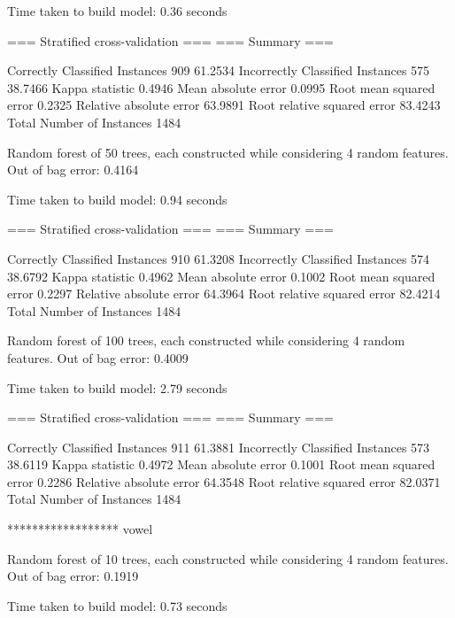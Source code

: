 Time taken to build model: 0.36 seconds

=== Stratified cross-validation ===
=== Summary ===

Correctly Classified Instances         909               61.2534 %
Incorrectly Classified Instances       575               38.7466 %
Kappa statistic                          0.4946
Mean absolute error                      0.0995
Root mean squared error                  0.2325
Relative absolute error                 63.9891 %
Root relative squared error             83.4243 %
Total Number of Instances             1484



Random forest of 50 trees, each constructed while considering 4 random features.
Out of bag error: 0.4164



Time taken to build model: 0.94 seconds

=== Stratified cross-validation ===
=== Summary ===

Correctly Classified Instances         910               61.3208 %
Incorrectly Classified Instances       574               38.6792 %
Kappa statistic                          0.4962
Mean absolute error                      0.1002
Root mean squared error                  0.2297
Relative absolute error                 64.3964 %
Root relative squared error             82.4214 %
Total Number of Instances             1484


Random forest of 100 trees, each constructed while considering 4 random features.
Out of bag error: 0.4009



Time taken to build model: 2.79 seconds

=== Stratified cross-validation ===
=== Summary ===

Correctly Classified Instances         911               61.3881 %
Incorrectly Classified Instances       573               38.6119 %
Kappa statistic                          0.4972
Mean absolute error                      0.1001
Root mean squared error                  0.2286
Relative absolute error                 64.3548 %
Root relative squared error             82.0371 %
Total Number of Instances             1484


****************** vowel

Random forest of 10 trees, each constructed while considering 4 random features.
Out of bag error: 0.1919



Time taken to build model: 0.73 seconds


